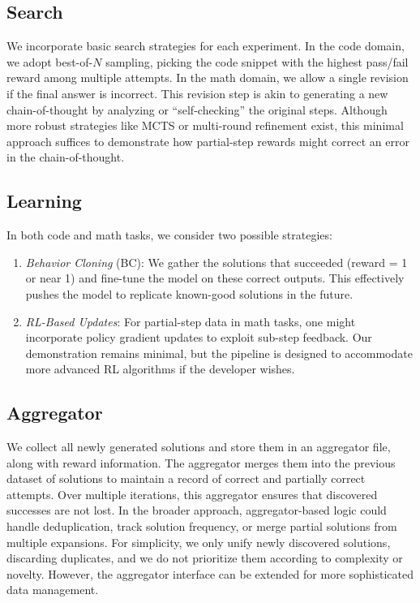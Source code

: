 \documentclass{article}
\begin{document}
\subsection{Search}
We incorporate basic search strategies for each experiment. In the code domain, we adopt best-of-\(N\) sampling, picking the code snippet with the highest pass/fail reward among multiple attempts. In the math domain, we allow a single revision if the final answer is incorrect. This revision step is akin to generating a new chain-of-thought by analyzing or “self-checking” the original steps. Although more robust strategies like MCTS or multi-round refinement exist, this minimal approach suffices to demonstrate how partial-step rewards might correct an error in the chain-of-thought.

\subsection{Learning}
In both code and math tasks, we consider two possible strategies:
\begin{enumerate}
\item \textit{Behavior Cloning} (BC): We gather the solutions that succeeded (reward = 1 or near 1) and fine-tune the model on these correct outputs. This effectively pushes the model to replicate known-good solutions in the future.
\item \textit{RL-Based Updates}: For partial-step data in math tasks, one might incorporate policy gradient updates to exploit sub-step feedback. Our demonstration remains minimal, but the pipeline is designed to accommodate more advanced RL algorithms if the developer wishes.
\end{enumerate}

\subsection{Aggregator}
We collect all newly generated solutions and store them in an aggregator file, along with reward information. The aggregator merges them into the previous dataset of solutions to maintain a record of correct and partially correct attempts. Over multiple iterations, this aggregator ensures that discovered successes are not lost. In the broader approach, aggregator-based logic could handle deduplication, track solution frequency, or merge partial solutions from multiple expansions. For simplicity, we only unify newly discovered solutions, discarding duplicates, and we do not prioritize them according to complexity or novelty. However, the aggregator interface can be extended for more sophisticated data management.
\end{document}
